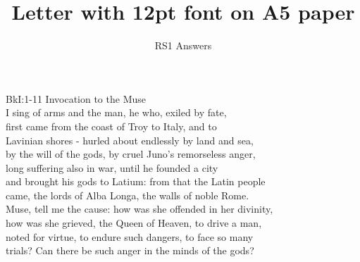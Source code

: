 \documentclass[12pt, a5paper, titlepage]{letter}
\title{Letter with 12pt font on A5 paper}
\author{RS1 Answers}
\date{}
\begin{document}

{BkI:1-11 Invocation to the Muse}\\
I sing of arms and the man, he who, exiled by fate,\\
first came from the coast of Troy to Italy, and to\\
Lavinian shores - hurled about endlessly by land and sea,\\
by the will of the gods, by cruel Juno's remorseless anger,\\
long suffering also in war, until he founded a city\\
and brought his gods to Latium: from that the Latin people\\
came, the lords of Alba Longa, the walls of noble Rome.\\
Muse, tell me the cause: how was she offended in her divinity,\\
how was she grieved, the Queen of Heaven, to drive a man,\\
noted for virtue, to endure such dangers, to face so many\\
trials? Can there be such anger in the minds of the gods?
\end{document}
